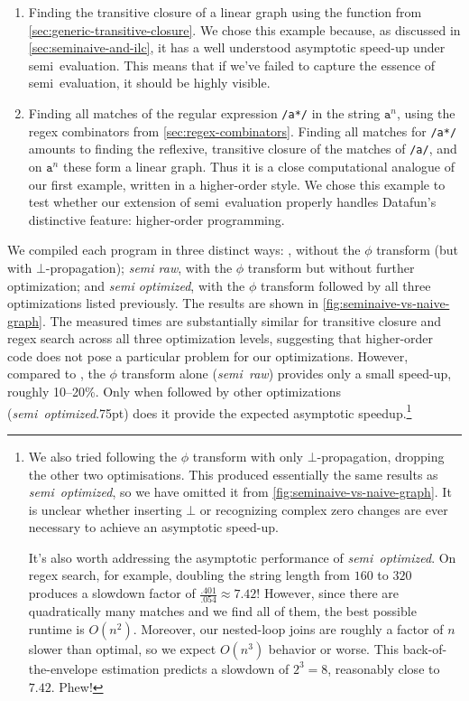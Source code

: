 \begin{enumerate}
\item Finding the transitive closure of a linear graph using the 
  function from \cref{sec:generic-transitive-closure}. We chose this example
  because, as discussed in \cref{sec:seminaive-and-ilc}, it has a well
  understood asymptotic speed-up under semi\naive\ evaluation. This means that
  if we've failed to capture the essence of semi\naive\ evaluation, it should be
  highly visible.

\item Finding all matches of the regular expression \texttt{/a*/} in the string
  $\texttt{a}^n$, using the regex combinators from \cref{sec:regex-combinators}.
  Finding all matches for \texttt{/a*/} amounts to finding the reflexive,
  transitive closure of the matches of \texttt{/a/}, and on $\texttt{a}^n$ these
  form a linear graph. Thus it is a close computational analogue of our first
  example, written in a higher-order style. We chose this example to test
  whether our extension of semi\naive\ evaluation properly handles Datafun's
  distinctive feature: higher-order programming.
\end{enumerate}

We compiled each program in three distinct ways: \emph{\naive{}}, without the
$\phi$ transform (but with $\bot$-propagation); \emph{semi\naive{} raw}, with
the $\phi$ transform but without further optimization; and \emph{semi\naive{}
  optimized}, with the $\phi$ transform followed by all three optimizations listed
previously. The results are shown in \cref{fig:seminaive-vs-naive-graph}.
%
The measured times are substantially similar for transitive closure and regex
search across all three optimization levels, suggesting that higher-order code
does not pose a particular problem for our optimizations. However, compared to
\emph{\naive}, the $\phi$ transform alone (\emph{semi\naive\ raw}) provides only
a small speed-up, roughly 10--20\%. Only when followed by other optimizations
(\emph{semi\naive\ optimized}\kern.75pt) does it provide the expected asymptotic
speedup.\footnote{We also tried following the $\phi$ transform with only
  $\bot$-propagation, dropping the other two optimisations. This produced
  essentially the same results as \emph{semi\naive\ optimized}, so we have omitted it
  from \cref{fig:seminaive-vs-naive-graph}. It is unclear whether inserting
  $\bot$ or recognizing complex zero changes are ever necessary to achieve an
  asymptotic speed-up.

  It's also worth addressing the asymptotic performance of
  \emph{semi\naive\ optimized}. On regex search, for example, doubling the string
  length from $160$ to $320$ produces a slowdown factor of $\frac{.401}{.054}
  \approx 7.42$! However, since there are quadratically many matches and we find
  all of them, the best possible runtime is $O(n^2)$. Moreover, our nested-loop
  joins are roughly a factor of $n$ slower than optimal, so we expect $O(n^3)$
  behavior or worse. This back-of-the-envelope estimation predicts a slowdown of
  $2^3 = 8$, reasonably close to $7.42$. Phew!}

